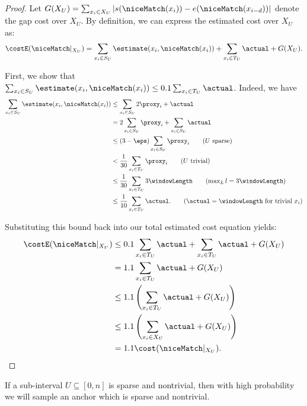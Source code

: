 \begin{proof}
    Let $G(X_U) = \sum_{x_i \in X_U} |s(\niceMatch(x_i)) - e(\niceMatch(x_{i-d}))|$ denote the gap cost over $X_U$. By definition, we can express the estimated cost over $X_U$ as:
    $$\costE(\niceMatch|_{X_U}) = \sum_{x_i \in S_U}\estimate(x_i, \niceMatch(x_i)) + \sum_{x_i \in T_U}\actual + G(X_U).$$
    
    First, we show that $\sum_{x_i \in S_U}\estimate(x_i, \niceMatch(x_i)) \leq 0.1 \sum_{x_i \in T_U}\actual$. Indeed, we have
    \begin{align*}
        \sum_{x_i \in S_U}\estimate(x_i, \niceMatch(x_i)) &\leq \sum_{x_i \in S_U}2\proxy_i + \actual \\
        &= 2\sum_{x_i \in S_U}\proxy_i + \sum_{x_i \in S_U}\actual \\
        &\leq (3-\eps)\sum_{x_i \in S_U}\proxy_i \tag{$U$ sparse}\\
        &<\frac{1}{30}\sum_{x_i \in T_U}\proxy_i \tag{$U$ trivial}\\
        &\leq \frac{1}{30}\sum_{x_i \in T_U}3\windowLength \tag{$\max_Ll = 3\windowLength$}\\
        &\leq \frac{1}{10}\sum_{x_i \in T_U}\actual. \tag{$\actual = \windowLength$ for trivial $x_i$}
    \end{align*}
    
    Substituting this bound back into our total estimated cost equation yields:
    \begin{align*}
        \costE(\niceMatch|_{X_U}) &\leq 0.1 \sum_{x_i \in T_U}\actual + \sum_{x_i \in T_U}\actual + G(X_U) \\
        &= 1.1 \sum_{x_i \in T_U}\actual + G(X_U) \\
        &\leq 1.1 \left( \sum_{x_i \in T_U}\actual + G(X_U) \right) \\
        &\leq 1.1 \left( \sum_{x_i \in X_U}\actual + G(X_U) \right) \\
        &= 1.1 \cost(\niceMatch|_{X_U}).
    \end{align*}
\end{proof}


\begin{lemma}
    \label{lem:anchors}
    If a sub-interval $U \subseteq [0, n]$ is sparse and nontrivial, then with high probability we will sample an anchor which is sparse and nontrivial.
\end{lemma}

